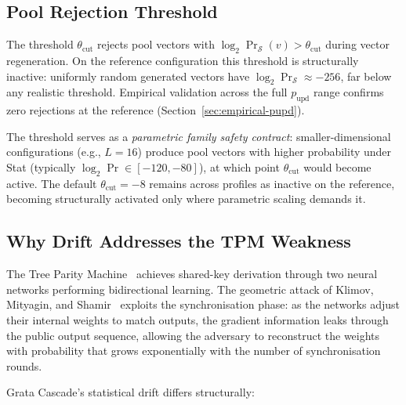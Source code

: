 \documentclass[11pt,a4paper]{article}
\begin{document}
\subsection{Pool Rejection Threshold}

The threshold $\theta_{\text{cut}}$ rejects pool vectors with $\log_2 \Pr_\mathcal{S}(v) > \theta_{\text{cut}}$ during vector regeneration. On the reference configuration this threshold is structurally inactive: uniformly random generated vectors have $\log_2 \Pr_\mathcal{S} \approx -256$, far below any realistic threshold. Empirical validation across the full $p_\text{upd}$ range confirms zero rejections at the reference (Section~\ref{sec:empirical-pupd}).

The threshold serves as a \emph{parametric family safety contract}: smaller-dimensional configurations (e.g., $L = 16$) produce pool vectors with higher probability under Stat (typically $\log_2 \Pr \in [-120, -80]$), at which point $\theta_{\text{cut}}$ would become active. The default $\theta_{\text{cut}} = -8$ remains across profiles as inactive on the reference, becoming structurally activated only where parametric scaling demands it.

\subsection{Why Drift Addresses the TPM Weakness}\label{sec:tpm-weakness}

The Tree Parity Machine~\cite{KKK2002} achieves shared-key derivation through two neural networks performing bidirectional learning. The geometric attack of Klimov, Mityagin, and Shamir~\cite{KMS2003} exploits the synchronisation phase: as the networks adjust their internal weights to match outputs, the gradient information leaks through the public output sequence, allowing the adversary to reconstruct the weights with probability that grows exponentially with the number of synchronisation rounds.

Grata Cascade's statistical drift differs structurally:
\end{document}

